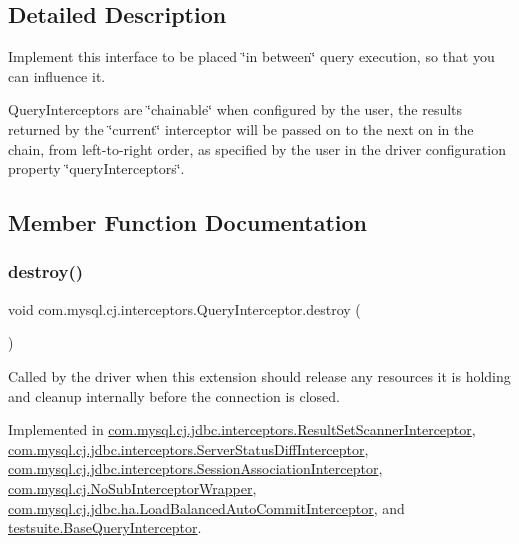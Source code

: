\subsection{Detailed Description}
Implement this interface to be placed \char`\"{}in between\char`\"{} query execution, so that you can influence it.

Query\+Interceptors are \char`\"{}chainable\char`\"{} when configured by the user, the results returned by the \char`\"{}current\char`\"{} interceptor will be passed on to the next on in the chain, from left-\/to-\/right order, as specified by the user in the driver configuration property \char`\"{}query\+Interceptors\char`\"{}. 

\subsection{Member Function Documentation}
\mbox{\label{interfacecom_1_1mysql_1_1cj_1_1interceptors_1_1_query_interceptor_a123809a91800f4f4409f5f37717bf9c8}} 
\subsubsection{\texorpdfstring{destroy()}{destroy()}}
{\footnotesize\ttfamily void com.\+mysql.\+cj.\+interceptors.\+Query\+Interceptor.\+destroy (\begin{DoxyParamCaption}{ }\end{DoxyParamCaption})}

Called by the driver when this extension should release any resources it is holding and cleanup internally before the connection is closed. 

Implemented in \mbox{\hyperlink{classcom_1_1mysql_1_1cj_1_1jdbc_1_1interceptors_1_1_result_set_scanner_interceptor_a6e0fa82b6d4827d34c1db0676419efa5}{com.\+mysql.\+cj.\+jdbc.\+interceptors.\+Result\+Set\+Scanner\+Interceptor}}, \mbox{\hyperlink{classcom_1_1mysql_1_1cj_1_1jdbc_1_1interceptors_1_1_server_status_diff_interceptor_a119b87c009b04d7290f38b3e857a09d3}{com.\+mysql.\+cj.\+jdbc.\+interceptors.\+Server\+Status\+Diff\+Interceptor}}, \mbox{\hyperlink{classcom_1_1mysql_1_1cj_1_1jdbc_1_1interceptors_1_1_session_association_interceptor_a2bbe0b1b240f2ab943ba68fe979cf3a9}{com.\+mysql.\+cj.\+jdbc.\+interceptors.\+Session\+Association\+Interceptor}}, \mbox{\hyperlink{classcom_1_1mysql_1_1cj_1_1_no_sub_interceptor_wrapper_a196b252abd96fbdd70d0dd6f844145b8}{com.\+mysql.\+cj.\+No\+Sub\+Interceptor\+Wrapper}}, \mbox{\hyperlink{classcom_1_1mysql_1_1cj_1_1jdbc_1_1ha_1_1_load_balanced_auto_commit_interceptor_a57d2b1b50e5b81d3bf07df78f7e657c3}{com.\+mysql.\+cj.\+jdbc.\+ha.\+Load\+Balanced\+Auto\+Commit\+Interceptor}}, and \mbox{\hyperlink{classtestsuite_1_1_base_query_interceptor_a8f368e0057821e78db66d4282c4d3b8e}{testsuite.\+Base\+Query\+Interceptor}}.

